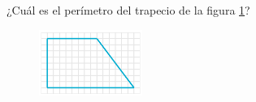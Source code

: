 
\question[25]  ¿Cuál es el perímetro del trapecio de la figura \ref{fig:peri_trap_01}?
\begin{figure}[H]
    \begin{center}
        \includegraphics[width=0.3\textwidth]{../images/peri_trap_01.png}
    \end{center}
    \caption{}
    \label{fig:peri_trap_01}
\end{figure}
